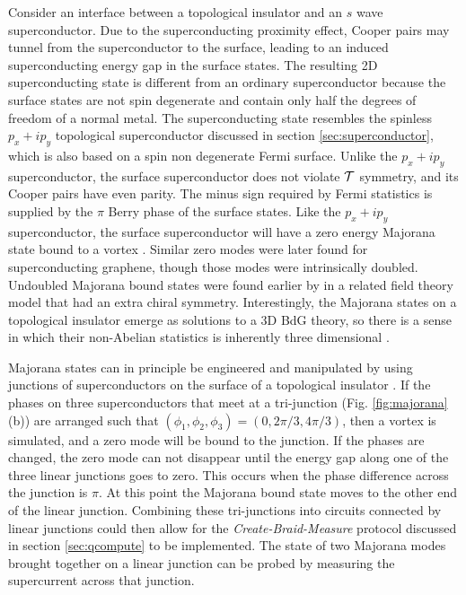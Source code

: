 \documentclass[twocolumn,floatfix,showpacs,rmp,aps]{revtex4}
\begin{document}
Consider an interface between a topological insulator and an $s$ wave superconductor.
Due to the superconducting proximity effect, Cooper pairs may tunnel from the
superconductor to the surface, leading to
an induced superconducting energy gap in the surface states.  The resulting
2D superconducting state is different from an ordinary
superconductor because the surface states are not spin degenerate and
contain only half the degrees of freedom of a normal metal.  The
superconducting state resembles the spinless $p_x+i p_y$ topological superconductor discussed in
section \ref{sec:superconductor}, which is also based on a spin non degenerate Fermi
surface.   Unlike the $p_x+i p_y$ superconductor, the surface superconductor does not
violate ${\cal T}$ symmetry, and its Cooper pairs have even
parity.  The minus sign required by Fermi statistics is supplied by the $\pi$
Berry phase of the surface states.  Like the $p_x+ip_y$ superconductor,
the surface superconductor will have a zero energy Majorana state
bound to a vortex \cite{fukane08}.
Similar zero modes were later found for superconducting
graphene\cite{ghaemi07,bergman09}, though those modes were intrinsically doubled.
Undoubled Majorana bound states were found earlier by \textcite{jackiw81}
in a related field theory model that had an extra chiral symmetry.
Interestingly, the Majorana states on a topological insulator
emerge as solutions to a 3D BdG theory, so there is a sense in which their
non-Abelian statistics is inherently three dimensional \cite{teokane10}.

Majorana states can in principle be engineered and manipulated by using junctions of superconductors
on the surface of a topological insulator \cite{fukane08}.   If the phases on three superconductors
that meet at a tri-junction (Fig. \ref{fig:majorana}(b)) are arranged such that $(\phi_1,\phi_2,\phi_3) =
(0,2\pi/3,4\pi/3)$, then a vortex is simulated, and a zero mode will
be bound to the junction.  If the phases are changed, the zero mode
can not disappear until the energy gap along one of the three linear
junctions goes to zero.  This occurs when the phase difference across
the junction is $\pi$.  At this point the Majorana bound state moves to the
other end of the linear junction.  Combining these tri-junctions into
circuits connected by linear junctions could then allow for
the {\it Create-Braid-Measure} protocol discussed in section
\ref{sec:qcompute} to be implemented.
The state of two Majorana modes brought
together on a linear junction can be probed by measuring the
supercurrent across that junction.
\end{document}
